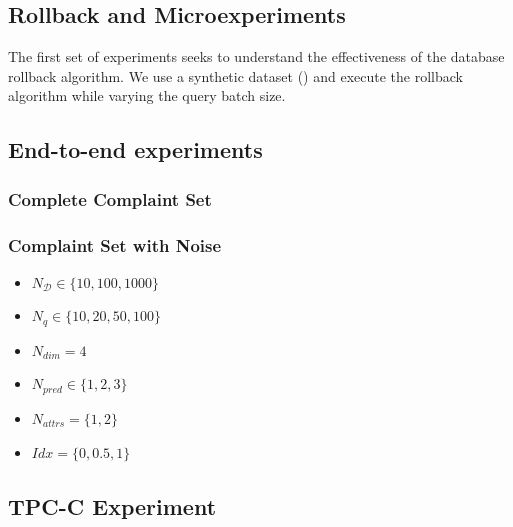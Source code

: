 \subsection{Rollback and \qfix Microexperiments}


The first set of experiments seeks to understand the effectiveness of the database rollback
algorithm.  We use a synthetic dataset () and execute the rollback algorithm
while varying the query batch size.

\subsection{End-to-end experiments}

\subsubsection{Complete Complaint Set}

\subsubsection{Complaint Set with Noise}

\begin{itemize}
\item $N_\mathcal{D} \in \{10, 100, 1000\}$
\item $N_q \in \{10, 20, 50, 100\}$
\item $N_{dim} = 4$
\item $N_{pred} \in \{1, 2, 3\}$
\item $N_{attrs} = \{1, 2\}$
\item $Idx = \{0, 0.5, 1\}$
\end{itemize}

\subsection{TPC-C Experiment}


